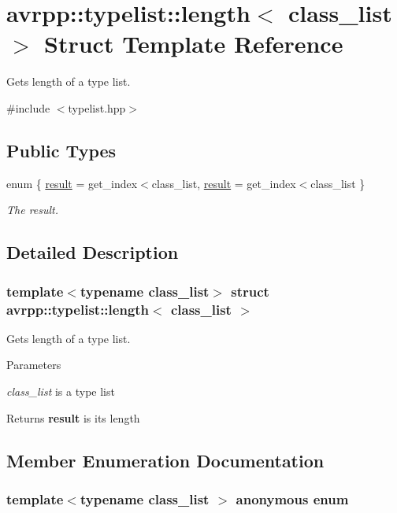 \hypertarget{structavrpp_1_1typelist_1_1length}{
\section{avrpp::typelist::length$<$ class\_\-list $>$ Struct Template Reference}
\label{structavrpp_1_1typelist_1_1length}
}


Gets length of a type list.  




{\ttfamily \#include $<$typelist.hpp$>$}

\subsection*{Public Types}
\begin{DoxyCompactItemize}
\item 
enum \{ \hyperlink{structavrpp_1_1typelist_1_1length_a919713c31f5b520c54da73492a18119aa362ad8561585e63cf5f334628e31b309}{result} = get\_\-index$<$class\_\-list, 
\hyperlink{structavrpp_1_1typelist_1_1length_a919713c31f5b520c54da73492a18119aa362ad8561585e63cf5f334628e31b309}{result} = get\_\-index$<$class\_\-list
 \}
\begin{DoxyCompactList}\small\item\em The result. \item\end{DoxyCompactList}\end{DoxyCompactItemize}


\subsection{Detailed Description}
\subsubsection*{template$<$typename class\_\-list$>$ struct avrpp::typelist::length$<$ class\_\-list $>$}

Gets length of a type list. 
\begin{DoxyParams}{Parameters}
\item[{\em class\_\-list}]is a type list \end{DoxyParams}
\begin{DoxyReturn}{Returns}
{\bfseries result} is its length 
\end{DoxyReturn}


\subsection{Member Enumeration Documentation}
\hypertarget{structavrpp_1_1typelist_1_1length_a919713c31f5b520c54da73492a18119a}{
\subsubsection[{"@34}]{\setlength{\rightskip}{0pt plus 5cm}template$<$typename class\_\-list $>$ anonymous enum}}
\label{structavrpp_1_1typelist_1_1length_a919713c31f5b520c54da73492a18119a}


